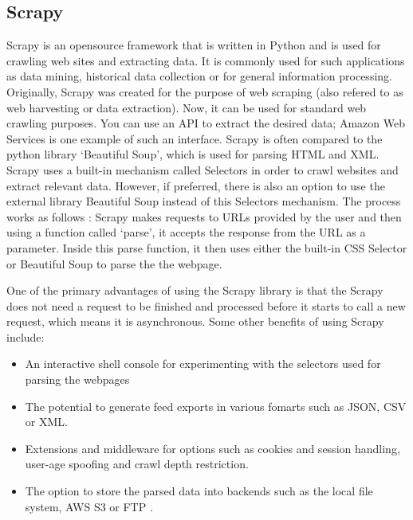 \subsection{Scrapy}
Scrapy is an opensource framework that is written in Python and is used for crawling web sites and extracting data. It is commonly used for such applications as data mining, historical data collection or for general information processing. Originally, Scrapy was created for the purpose of web scraping (also refered to as web harvesting or data extraction). Now, it can be used for standard web crawling purposes. You can use an API to extract the desired data; Amazon Web Services is one example of such an interface. Scrapy is often compared to the python library ‘Beautiful Soup’, which is used for parsing HTML and XML. Scrapy uses a built-in mechanism called Selectors in order to crawl websites and extract relevant data.  However, if preferred, there is also an option to use the external library Beautiful Soup instead of this Selectors mechanism. 
The process works as follows : Scrapy makes requests to URLs provided by the user and then using a function called ‘parse’, it accepts the response from the URL as a parameter. Inside this parse function, it then uses either the built-in CSS Selector or Beautiful Soup to parse the the webpage.

One of the primary advantages of using the Scrapy library is that the Scrapy does not need a request to be finished and processed before it starts to call a new request, which means it is asynchronous.
Some other benefits of using Scrapy include:
\begin{itemize}
	\item An interactive shell console for experimenting with the selectors used for parsing the webpages
	\item The potential to generate feed exports in various fomarts such as JSON, CSV or XML.
	\item Extensions and middleware for options such as cookies and session handling, user-age spoofing and crawl depth restriction.
	\item The option to store the parsed data into backends such as the local file system, AWS S3 or FTP \cite{scrapy}.
\end{itemize}

